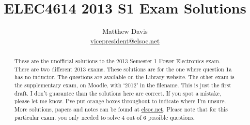 \documentclass[a4paper]{article}
\title{ELEC4614 2013 S1 Exam Solutions}
\author{Matthew Davis \\ \href{mailto:vicepresident@elsoc.net}{vicepresident@elsoc.net}}
\begin{document}
\maketitle

\begin{abstract}
    These are the unofficial solutions to the 2013 Semester 1 Power Electronics exam.
    There are two different 2013 exams. 
    These solutions are for the one where question 1a has no inductor. The questions are available on the Library website.
    The other exam is the supplementary exam, on Moodle, with `2012' in the filename.
    This is just the first draft. I don't guarantee than the solutions here are correct. If you spot a mistake, please let me know. I've put orange boxes throughout to indicate where I'm unsure.
    More solutions, papers and notes can be found at \href{www.elsoc.net}{elsoc.net}.
    Please note that for this particular exam, you only needed to solve 4 out of 6 possible questions.
\end{abstract}


\tableofcontents







\end{document}
